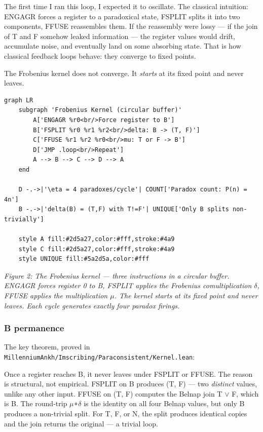 \documentclass[12pt,a4paper]{article}
\begin{document}
The first time I ran this loop, I expected it to oscillate. The classical intuition: ENGAGR forces a register to a paradoxical state, FSPLIT splits it into two components, FFUSE reassembles them. If the reassembly were lossy --- if the join of T and F somehow leaked information --- the register values would drift, accumulate noise, and eventually land on some absorbing state. That is how classical feedback loops behave: they converge to fixed points.

The Frobenius kernel does not converge. It \emph{starts} at its fixed point and never leaves.

\begin{lstlisting}[language=mermaid]
graph LR
    subgraph 'Frobenius Kernel (circular buffer)'
        A['ENGAGR %r0<br/>Force register to B']
        B['FSPLIT %r0 %r1 %r2<br/>delta: B -> (T, F)']
        C['FFUSE %r1 %r2 %r0<br/>mu: T or F -> B']
        D['JMP .loop<br/>Repeat']
        A --> B --> C --> D --> A
    end

    D -.->|'\eta = 4 paradoxes/cycle'| COUNT['Paradox count: P(n) = 4n']
    B -.->|'delta(B) = (T,F) with T!=F'| UNIQUE['Only B splits non-trivially']

    style A fill:#2d5a27,color:#fff,stroke:#4a9
    style C fill:#2d5a27,color:#fff,stroke:#4a9
    style UNIQUE fill:#5a2d5a,color:#fff
\end{lstlisting}

\emph{Figure 2: The Frobenius kernel --- three instructions in a circular buffer. ENGAGR forces register 0 to B, FSPLIT applies the Frobenius comultiplication $\delta$, FFUSE applies the multiplication $\mu$. The kernel starts at its fixed point and never leaves. Each cycle generates exactly four paradox firings.}

\subsubsection{B permanence}

The key theorem, proved in \texttt{MillenniumAnkh/Imscribing/Paraconsistent/Kernel.lean}:

Once a register reaches B, it never leaves under FSPLIT or FFUSE. The reason is structural, not empirical. FSPLIT on B produces (T, F) --- two \emph{distinct} values, unlike any other input. FFUSE on (T, F) computes the Belnap join T $\lor$ F, which is B. The round-trip $\mu$∘$\delta$ is the identity on all four Belnap values, but only B produces a non-trivial split. For T, F, or N, the split produces identical copies and the join returns the original --- a trivial loop.
\end{document}
